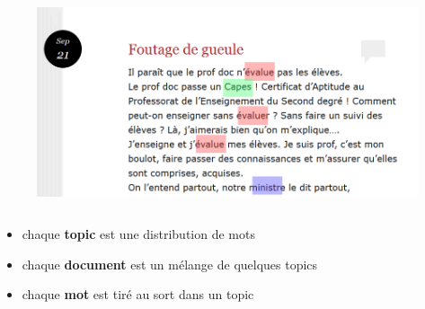 \documentclass[11pt]{beamer}
\begin{document}
\begin{frame}
\begin{columns}
\begin{column}{0.65\linewidth}
\centering
\begin{figure}
\includegraphics[width=\textwidth]{./blogaladoc2.png}
\end{figure}
\end{column}

\end{columns}

\vspace{0.3cm}

\begin{itemize}
\item chaque \textbf{topic} est une distribution de mots
\pause
\item chaque \textbf{document} est un mélange de quelques topics
\pause
\item chaque \textbf{mot} est tiré au sort dans un topic
\end{itemize}
\end{frame}
\end{document}
